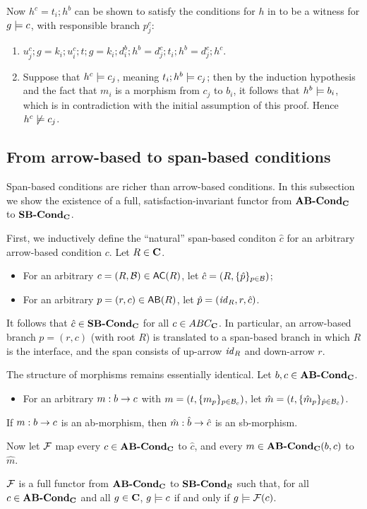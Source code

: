 Now $h^c=t_i;h^b$ can be shown to satisfy the conditions for $h$ in  to be a witness for $g\models c$, with responsible branch $p^c_j$:
\begin{enumerate}
\item $u^c_j;g = k_i;u^c_i;t;g= k_i;d^b_i;h^b = d^c_j;t_i;h^b=d^c_j;h^c$.
\item Suppose that $h^c\models c_j$, meaning $t_i;h^b\models c_j$; then by the induction hypothesis and the fact that $m_i$ is a morphism from $c_j$ to $b_i$, it follows that $h^b\models b_i$, which is in contradiction with the initial assumption of this proof. Hence $h^c\not\models c_j$.
\end{enumerate}

\subsection{From arrow-based to span-based conditions}

Span-based conditions are richer than arrow-based conditions. In this subsection we show the existence of a full, satisfaction-invariant functor from $\textbf{AB-Cond}_{\mathbf{C}}$ to $\textbf{SB-Cond}_{\mathbf{C}}$.

First, we inductively define the ``natural'' span-based conditon $\hat c$ for an arbitrary arrow-based condition $c$. Let $R\in\mathbf{C}$.
\begin{itemize}
\item For an arbitrary $c=(R,\cB)\in \AC R$, let $\hat c=(R,\{{\hat p}\}_{p\in\mathcal{B}})$; 
\item For an arbitrary $p=(r,c)\in \AB R$, let $\hat p=(\mathit{id}_R,r,\hat c)$.
\end{itemize}
%
It follows that $\hat c\in \textbf{SB-Cond}_{\mathbf{C}}$ for all $c\in ABC_{\mathbf{C}}$. In particular, an arrow-based branch $p=(r,c)$ (with root $R$) is translated to a span-based branch in which $R$ is the interface, and the span consists of up-arrow $\mathit{id}_R$ and down-arrow $r$.

The structure of morphisms remains essentially identical. Let $b,c\in \textbf{AB-Cond}_{\mathbf{C}}$.
%
\begin{itemize}
\item For an arbitrary $m:b\rightarrow c$ with $m=(t,\{{m_p}\}_{p\in \mathcal{B}_c})$, let $\hat m=(t,\{{\hat m_p}\}_{\hat p\in \mathcal{B}_{\hat c}})$.
\end{itemize}
%
\begin{proposition}
If $m:b\rightarrow c$ is an ab-morphism, then $\hat m:\hat b\rightarrow \hat c$ is an sb-morphism.
\end{proposition}
%
Now let $\mathcal{F}$ map every $c\in \textbf{AB-Cond}_{\mathbf{C}}$ to $\hat c$, and every $m\in \textbf{AB-Cond}_{\mathbf{C}}(b,c)$ to $\hat m$.

\begin{theorem}
$\mathcal{F}$ is a full functor from $\textbf{AB-Cond}_{\mathbf{C}}$ to $\textbf{SB-Cond}_{\mathcal{B}}$ such that, for all $c\in \textbf{AB-Cond}_{\mathbf{C}}$ and all $g\in \mathbf{C}$, $g\models c$ if and only if $g\models \mathcal{F}(c)$.
\end{theorem}




